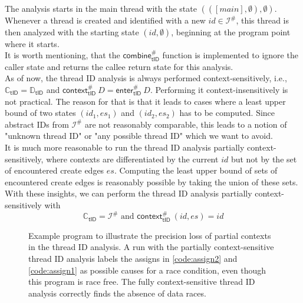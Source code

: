   The analysis starts in the main thread with the state $(([main], \emptyset), \emptyset)$. Whenever a thread is created and identified with a new $id \in \mathcal{I}^{\#}$, this thread is then analyzed with the starting state $(id, \emptyset)$, beginning at the program point where it starts.\\
  It is worth mentioning, that the $\textsf{combine}^{\#}_\textsf{tID}$ function is implemented to ignore the caller state and returns the callee return state for this analysis.
  \\
  As of now, the thread ID analysis is always performed context-sensitively, i.e., $\mathbb{C}_\textsf{tID} = \mathbb{D}_\textsf{tID}$ and $\textsf{context}^{\#}_\textsf{tID}\ D = \textsf{enter}^{\#}_\textsf{tID}\ D$. Performing it context-insensitively is not practical. The reason for that is that it leads to cases where a least upper bound of two states $(id_1, es_1)$ and $(id_2, es_2)$ has to be computed. Since abstract IDs from $\mathcal{I}^{\#}$ are not reasonably comparable, this leads to a notion of "unknown thread ID" or "any possible thread ID" which we want to avoid.\\
  It is much more reasonable to run the thread ID analysis partially context-sensitively, where contexts are differentiated by the current $id$ but not by the set of encountered create edges $es$. Computing the least upper bound of sets of encountered create edges is reasonably possible by taking the union of these sets. With these insights, we can perform the thread ID analysis partially context-sensitively with
  \[\mathbb{C}_\textsf{tID} = \mathcal{I}^{\#} \text{ and } \textsf{context}^{\#}_\textsf{tID}\ (id, es) = id\]

  \begin{figure}[!ht]
    \centering
    \begin{subfigure}{.35\textwidth}
      \centering
      
    \end{subfigure}
    \caption[Example program to illustrate the precision loss of partial contexts in the thread ID analysis.]{Example program to illustrate the precision loss of partial contexts in the thread ID analysis. A run with the partially context-sensitive thread ID analysis labels the assigns in \autoref{code:assign2} and \autoref{code:assign1} as possible causes for a race condition, even though this program is race free. The fully context-sensitive thread ID analysis correctly finds the absence of data races.}
    \label{fig:example_thread}
  \end{figure}

